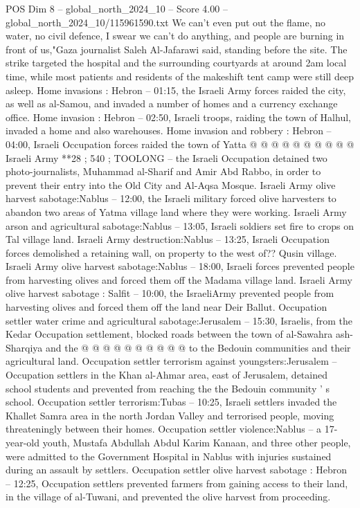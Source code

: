 \begin{textsample}{POS Dim 8 – global\_north\_2024\_10 – Score 4.00 – global\_north\_2024\_10/115961590.txt}
We can't even put out the flame, no water, no civil defence, I swear we can't do anything, and people are burning in front of us,"Gaza journalist Saleh Al-Jafarawi said, standing before the site.
The strike targeted the hospital and the surrounding courtyards at around 2am local time, while most patients and residents of the makeshift tent camp were still deep asleep.
Home invasions : Hebron -- 01:15, the Israeli Army forces raided the city, as well as al-Samou, and invaded a number of homes and a currency exchange office.
Home invasion : Hebron -- 02:50, Israeli troops, raiding the town of Halhul, invaded a home and also warehouses.
Home invasion and robbery : Hebron -- 04:00, Israeli Occupation forces raided the town of Yatta @ @ @ @ @ @ @ @ @ @ Israeli Army **28 ; 540 ; TOOLONG -- the Israeli Occupation detained two photo-journalists, Muhammad al-Sharif and Amir Abd Rabbo, in order to prevent their entry into the Old City and Al-Aqsa Mosque.
Israeli Army olive harvest sabotage:Nablus -- 12:00, the Israeli military forced olive harvesters to abandon two areas of Yatma village land where they were working.
Israeli Army arson and agricultural sabotage:Nablus -- 13:05, Israeli soldiers set fire to crops on Tal village land.
Israeli Army destruction:Nablus -- 13:25, Israeli Occupation forces demolished a retaining wall, on property to the west of??
Qusin village.
Israeli Army olive harvest sabotage:Nablus -- 18:00, Israeli forces prevented people from harvesting olives and forced them off the Madama village land.
Israeli Army olive harvest sabotage : Salfit -- 10:00, the IsraeliArmy prevented people from harvesting olives and forced them off the land near Deir Ballut.
Occupation settler water crime and agricultural sabotage:Jerusalem -- 15:30, Israelis, from the Kedar Occupation settlement, blocked roads between the town of al-Sawahra ash-Sharqiya and the @ @ @ @ @ @ @ @ @ @ to the Bedouin communities and their agricultural land.
Occupation settler terrorism against youngsters:Jerusalem -- Occupation settlers in the Khan al-Ahmar area, east of Jerusalem, detained school students and prevented from reaching the the Bedouin community ' s school.
Occupation settler terrorism:Tubas -- 10:25, Israeli settlers invaded the Khallet Samra area in the north Jordan Valley and terrorised people, moving threateningly between their homes.
Occupation settler violence:Nablus -- a 17-year-old youth, Mustafa Abdullah Abdul Karim Kanaan, and three other people, were admitted to the Government Hospital in Nablus with injuries sustained during an assault by settlers.
Occupation settler olive harvest sabotage : Hebron -- 12:25, Occupation settlers prevented farmers from gaining access to their land, in the village of al-Tuwani, and prevented the olive harvest from proceeding.

\end{textsample}
